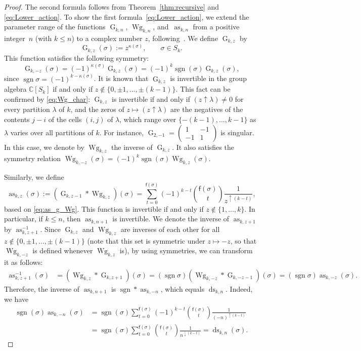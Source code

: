 \documentclass[pdftex]{sigma}
\numberwithin{equation}{section}
\theoremstyle{definition}
\newcommand{\fix}[1]{\mathsf{f}(#1)}
\DeclareMathOperator{\Raise}{as}
\DeclareMathOperator{\Lower}{ds}
\DeclareMathOperator{\sgn}{sgn}
\DeclareMathOperator{\G}{G}
\DeclareMathOperator{\Wg}{Wg}
\begin{document}
\begin{proof}
The second formula follows from Theorem~\ref{thm:recursive} and \eqref{eq:Lower_action}.
To show the first formula~\eqref{eq:Lower_action}, we extend the parameter range of the functions $\G_{k,n}$, $\Wg_{k,n}$, and~$\Raise_{k,n}$
from a positive integer~$n$ (with $k \le n$) to a complex number $z$, following~\cite{CollinsSniady2006}.
We define $\G_{k,z}$ by
\[
\G_{k,z} (\sigma) := z^{\kappa(\sigma)}, \qquad \sigma \in S_k.
\]
This function satisfies the following symmetry:
\[
\G_{k,-z}(\sigma)= (-1)^{\kappa(\sigma)} \G_{k,z}(\sigma)
=(-1)^k \sgn (\sigma) \G_{k,z}(\sigma),
\]
since $\sgn \sigma=(-1)^{k-\kappa(\sigma)}$.
It is known that $\G_{k,z}$ is invertible in the group algebra $\mathbb{C}[S_k]$ if and only if $z \not\in \{0, \pm 1, \dots, \pm(k-1)\}$.
This fact can be confirmed by \eqref{eq:Wg_char}: $\G_{k,z}$ is invertible if and only if $(z \uparrow \lambda) \neq 0$ for every partition $\lambda$ of $k$, and the zeros of $z \mapsto (z \uparrow \lambda)$ are the negatives of the contents $j-i$ of the cells $(i,j)$ of $\lambda$, which range over $\{-(k-1),\dots,k-1\}$ as $\lambda$ varies over all partitions of $k$. For instance, $\G_{2,-1}=\left(\begin{smallmatrix} 1 & -1 \\ -1 & 1\end{smallmatrix}\right)$ is singular.
In this case, we denote by $\Wg_{k,z}$ the inverse of $\G_{k,z}$.
It also satisfies the symmetry relation
$\Wg_{k,-z}(\sigma)=(-1)^k \sgn (\sigma) \Wg_{k,z}(\sigma)$.

Similarly, we define
\[
\Raise_{k,z}(\sigma) := (\G_{k,z-1} * \Wg_{k,z})(\sigma) =
\sum_{t=0}^{\fix{\sigma}} (-1)^{k-t} \binom{\fix{\sigma}}{t} \frac{1}{z^{\uparrow (k-t)}},
\]
based on \eqref{eq:as_g_Wg}.
This function is invertible if and only if $z \not\in \{1, \dots, k\}$.
In particular, if $k \le n$, then $\Raise_{k,n+1}$ is invertible.
We denote the inverse of $\Raise_{k,z+1}$ by $\Raise^{-1}_{k,z+1}$.
Since $\G_{k,z}$ and $\Wg_{k,z}$ are inverses of each other for all $z \not\in \{0, \pm 1, \dots, \pm(k-1)\}$ (note that this set is symmetric under $z \mapsto -z$, so that $\Wg_{k,-z}$ is defined whenever $\Wg_{k,z}$ is),
by using symmetries, we can transform it as follows:
\begin{align*}
\Raise^{-1}_{k,z+1} (\sigma)&= (\Wg_{k,z} * \G_{k,z+1}) (\sigma)
 = (\sgn \sigma) (\Wg_{k,-z} * \G_{k,-z-1})(\sigma) = (\sgn \sigma) \Raise_{k,-z}(\sigma).
\end{align*}
Therefore, the inverse of $\Raise_{k,n+1}$ is $\sgn * \Raise_{k,-n}$,
which equals $\Lower_{k,n}$. Indeed, we have
\begin{align*}
\sgn(\sigma) \Raise_{k,-n}(\sigma)
&=\sgn (\sigma)
\sum_{t=0}^{\fix{\sigma}} (-1)^{k-t} \binom{\fix{\sigma}}{t} \frac{1}{(-n)^{\uparrow (k-t)}} \\
&= \sgn (\sigma)
\sum_{t=0}^{\fix{\sigma}} \binom{\fix{\sigma}}{t} \frac{1}{n^{\downarrow (k-t)}} = \Lower_{k,n}(\sigma).\tag*{\qed}
\end{align*}\renewcommand{\qed}{}
\end{proof}
\end{document}
